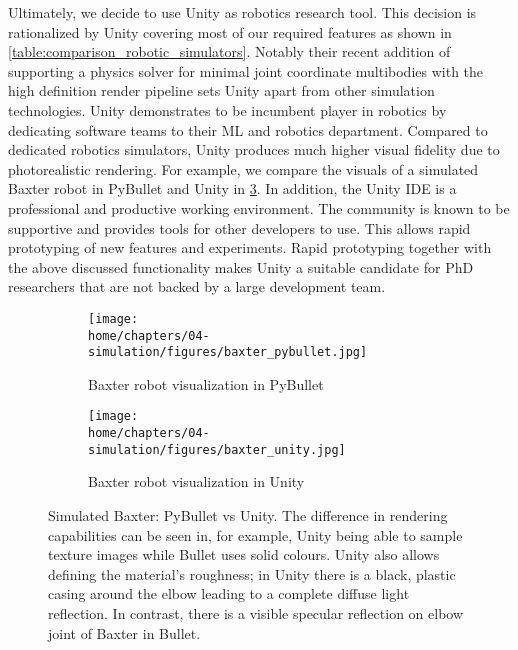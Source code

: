 \documentclass[\home/main.tex]{subfiles}
\begin{document}
Ultimately, we decide to use Unity as robotics research tool. This decision is rationalized by Unity covering most of our required features as shown in \cref{table:comparison_robotic_simulators}. Notably their recent addition of supporting a physics solver for minimal joint coordinate multibodies with the high definition render pipeline sets Unity apart from other simulation technologies. Unity demonstrates to be incumbent player in robotics by dedicating software teams to their ML and robotics department.
Compared to dedicated robotics simulators, Unity produces much higher visual fidelity due to photorealistic rendering. For example, we compare the visuals of a simulated Baxter robot in PyBullet and Unity in \cref{fig:baxter_unity_vs_pybullet}.
In addition, the Unity IDE is a professional and productive working environment. The community is known to be supportive and provides tools for other developers to use. This allows rapid prototyping of new features and experiments. Rapid prototyping together with the above discussed functionality makes Unity a suitable candidate for PhD researchers that are not backed by a large development team.

\begin{figure}[htpb]{}
    \centering
    \begin{subfigure}[b]{0.80\textwidth}
        \centering
        \texttt{[image: \\home/chapters/04-simulation/figures/baxter\_pybullet.jpg]}
        \caption{Baxter robot visualization in PyBullet}
        \label{fig:baxter_pybullet}
    \end{subfigure}

    \begin{subfigure}[b]{0.80\textwidth}
        \centering
        \texttt{[image: \\home/chapters/04-simulation/figures/baxter\_unity.jpg]}
        \caption{Baxter robot visualization in Unity}
        \label{fig:baxter_unity}
    \end{subfigure}

    \caption[]{Simulated Baxter: PyBullet vs Unity. The difference in rendering capabilities can be seen in, for example, Unity being able to sample texture images while Bullet uses solid colours. Unity also allows defining the material's roughness; in Unity there is a black, plastic casing around the elbow leading to a complete diffuse light reflection. In contrast, there is a visible specular reflection on elbow joint of Baxter in Bullet. }
    \label{fig:baxter_unity_vs_pybullet}
\end{figure}
\end{document}
